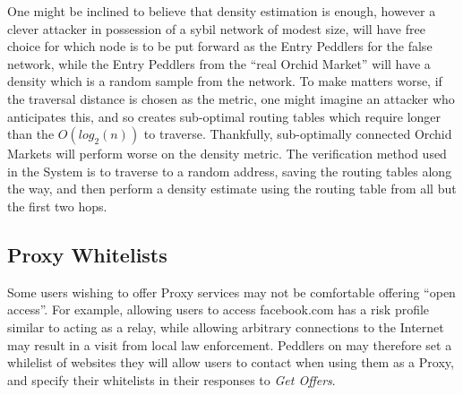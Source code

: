 One might be inclined to believe that density estimation is enough, however a clever attacker in possession of a sybil network of modest size, will have free choice for which node is to be put forward as the Entry Peddlers for the false network, while the Entry Peddlers from the ``real Orchid Market'' will have a density which is a random sample from the network. To make matters worse, if the traversal distance is chosen as the metric, one might imagine an attacker who anticipates this, and so creates sub-optimal routing tables which require longer than the $O(log_2(n))$ to traverse. Thankfully, sub-optimally connected Orchid Markets will perform worse on the density metric. The verification method used in the \Orchid{} System is to traverse to a random address, saving the routing tables along the way, and then perform a density estimate using the routing table from all but the first two hops.

\subsection{Proxy Whitelists}

Some users wishing to offer Proxy services may not be comfortable offering ``open access''. For example, allowing users to access facebook.com has a risk profile similar to acting as a relay, while allowing arbitrary connections to the Internet may result in a visit from local law enforcement. Peddlers on \tOM{} may therefore set a whilelist of websites they will allow users to contact when using them as a Proxy, and specify their whitelists in their responses to \emph{Get Offers}.
